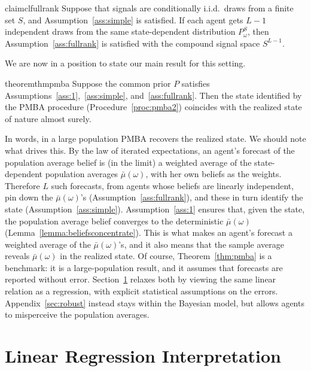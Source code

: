 \documentclass[12pt,reqno]{amsart}
\begin{document}
\begin{restatable}{claim}{clfullrank}\label{cl:fullrank}
Suppose that signals are conditionally i.i.d.\ draws from a finite set $S$, and Assumption~\ref{ass:simple} is satisfied. If each agent gets $L-1$ independent draws from the same state-dependent distribution $P_{\omega }^{S}$, then Assumption~\ref{ass:fullrank} is satisfied with the compound signal space $%
S^{L-1}$.
\end{restatable}

We are now in a position to state our main result for this setting.
\begin{restatable}{theorem}{thmpmba}\label{thm:pmba}
Suppose the common prior $P$ satisfies Assumptions~\ref{ass:1},~\ref{ass:simple}, and~\ref{ass:fullrank}. Then the state identified by the PMBA procedure (Procedure~\ref{proc:pmba2}) coincides with the realized state of nature almost surely.
\end{restatable}

In words, in a large population PMBA recovers the realized state. We should note what drives this. By the law of iterated expectations, an agent's forecast of the population average belief is (in the limit) a weighted average of the state-dependent population averages $\bar\mu(\omega)$, with her own beliefs as the weights. Therefore $L$ such forecasts, from agents whose beliefs are linearly independent, pin down the $\bar\mu(\omega)$'s (Assumption~\ref{ass:fullrank}), and these in turn identify the state (Assumption~\ref{ass:simple}). Assumption~\ref{ass:1} ensures that, given the state, the population average belief converges to the deterministic $\bar\mu(\omega)$ (Lemma~\ref{lemma:beliefsconcentrate}). This is what makes an agent's forecast a weighted average of the $\bar\mu(\omega)$'s, and it also means that the sample average reveals $\bar\mu(\omega)$ in the realized state. Of course, Theorem~\ref{thm:pmba} is a benchmark: it is a large-population result, and it assumes that forecasts are reported without error. Section~\ref{sec:linear} relaxes both by viewing the same linear relation as a regression, with explicit statistical assumptions on the errors. Appendix~\ref{sec:robust} instead stays within the Bayesian model, but allows agents to misperceive the population averages.







\section{Linear Regression Interpretation}\label{sec:linear}
\end{document}
